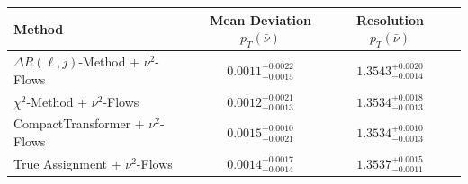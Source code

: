     \begin{tabular}{lccc}
        \toprule
        Method & Mean Deviation $p_{T}(\bar{\nu})$ & Resolution $p_{T}(\bar{\nu})$ \\
        \midrule
        $\Delta R(\ell,j)$-Method + $\nu^2$-Flows & $0.0011^{+0.0022}_{-0.0015}$ & $1.3543^{+0.0020}_{-0.0014}$ \\
        $\chi^2$-Method + $\nu^2$-Flows & $0.0012^{+0.0021}_{-0.0013}$ & $1.3534^{+0.0018}_{-0.0013}$ \\
        CompactTransformer + $\nu^2$-Flows & $0.0015^{+0.0010}_{-0.0021}$ & $1.3534^{+0.0010}_{-0.0013}$ \\
        True Assignment + $\nu^2$-Flows & $0.0014^{+0.0017}_{-0.0014}$ & $1.3537^{+0.0015}_{-0.0011}$ \\
        \bottomrule
    \end{tabular}